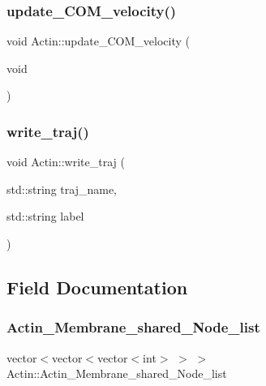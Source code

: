 \subsubsection{\texorpdfstring{update\_COM\_velocity()}{update\_COM\_velocity()}}
{\footnotesize\ttfamily void Actin\+::update\+\_\+\+C\+O\+M\+\_\+velocity (\begin{DoxyParamCaption}\item[{void}]{ }\end{DoxyParamCaption})\hspace{0.3cm}{\ttfamily [inline]}}

\mbox{\label{classActin_ab65dc5554a97210353818c736fd0414e}} 
\subsubsection{\texorpdfstring{write\_traj()}{write\_traj()}}
{\footnotesize\ttfamily void Actin\+::write\+\_\+traj (\begin{DoxyParamCaption}\item[{std\+::string}]{traj\+\_\+name,  }\item[{std\+::string}]{label }\end{DoxyParamCaption})}



\subsection{Field Documentation}
\mbox{\label{classActin_a575a56b45d7492503465078635e6340f}} 
\subsubsection{\texorpdfstring{Actin\_Membrane\_shared\_Node\_list}{Actin\_Membrane\_shared\_Node\_list}}
{\footnotesize\ttfamily vector$<$vector$<$vector$<$int$>$ $>$ $>$ Actin\+::\+Actin\+\_\+\+Membrane\+\_\+shared\+\_\+\+Node\+\_\+list}

\mbox{\label{classActin_aad926245a82c384b8e81dc55afec2f34}} 
